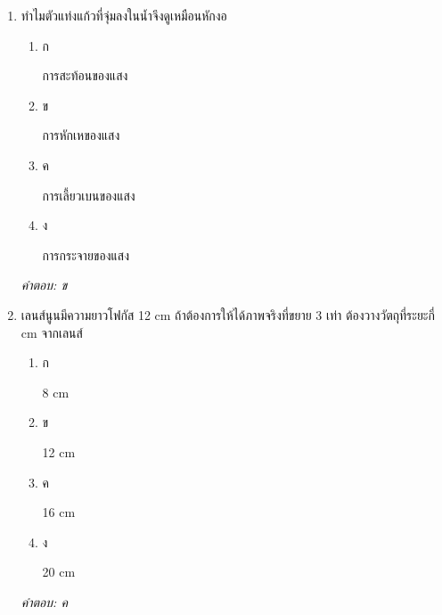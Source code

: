 \documentclass[12pt]{article}
\begin{document}
\begin{enumerate}[label=\arabic*., itemsep=0.5\baselineskip, topsep=0.5\baselineskip, leftmargin=*]
\item ทำไมตัวแท่งแก้วที่จุ่มลงในน้ำจึงดูเหมือนหักงอ
\begin{enumerate}[label=\alph*)., itemsep=0.3\baselineskip, topsep=0.3\baselineskip]
\item ก\ 
\begin{minipage}[t]{0.9\linewidth}
\raggedright การสะท้อนของแสง
\end{minipage}
\item ข\ 
\begin{minipage}[t]{0.9\linewidth}
\raggedright การหักเหของแสง
\end{minipage}
\item ค\ 
\begin{minipage}[t]{0.9\linewidth}
\raggedright การเลี้ยวเบนของแสง
\end{minipage}
\item ง\ 
\begin{minipage}[t]{0.9\linewidth}
\raggedright การกระจายของแสง
\end{minipage}
\end{enumerate}
\vspace{-0.3\baselineskip}
\begin{small}
\textit{คำตอบ: ข}
\end{small}

\item เลนส์นูนมีความยาวโฟกัส 12 cm ถ้าต้องการให้ได้ภาพจริงที่ขยาย 3 เท่า ต้องวางวัตถุที่ระยะกี่ cm จากเลนส์
\begin{enumerate}[label=\alph*)., itemsep=0.3\baselineskip, topsep=0.3\baselineskip]
\item ก\ 
\begin{minipage}[t]{0.9\linewidth}
\raggedright 8 cm
\end{minipage}
\item ข\ 
\begin{minipage}[t]{0.9\linewidth}
\raggedright 12 cm
\end{minipage}
\item ค\ 
\begin{minipage}[t]{0.9\linewidth}
\raggedright 16 cm
\end{minipage}
\item ง\ 
\begin{minipage}[t]{0.9\linewidth}
\raggedright 20 cm
\end{minipage}
\end{enumerate}
\vspace{-0.3\baselineskip}
\begin{small}
\textit{คำตอบ: ค}
\end{small}


\end{enumerate}
\end{document}
